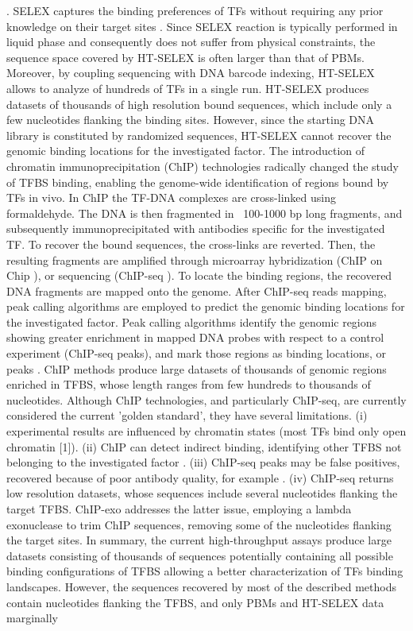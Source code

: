 \documentclass[a4paper, titlepage, 8pt, openright]{book}
\begin{document}
\citep{jolma2011methods,jolma2010multiplexed}. SELEX captures the binding preferences of TFs without requiring any prior knowledge on their target sites \citep{collas2008chop}. Since SELEX reaction is typically performed in liquid phase and consequently does not suffer from physical constraints, the sequence space covered by HT-SELEX is often larger than that of PBMs. Moreover, by coupling sequencing with DNA barcode indexing, HT-SELEX allows to analyze of hundreds of TFs in a single run. HT-SELEX produces datasets of thousands of high resolution bound sequences, which include only a few nucleotides flanking the binding sites. However, since the starting DNA library is constituted by randomized sequences, HT-SELEX cannot recover the genomic binding locations for the investigated factor. The introduction of chromatin immunoprecipitation (ChIP) technologies \citep{collas2008chop} radically changed the study of TFBS binding, enabling the genome-wide identification of regions bound by TFs in vivo. In ChIP the TF-DNA complexes are cross-linked using formaldehyde. The DNA is then fragmented in ~100-1000 bp long fragments, and subsequently immunoprecipitated with antibodies specific for the investigated TF. To recover the bound sequences, the cross-links are reverted. Then, the resulting fragments are amplified through microarray hybridization (ChIP on Chip \citep{collas2008chop,pillai2015chip}), or sequencing (ChIP-seq \citep{johnson2007genome,mardis2007chip}). To locate the binding regions, the recovered DNA fragments are mapped onto the genome. After ChIP-seq reads mapping, peak calling algorithms \citep{thomas2017features,guo2012high,zhang2008model} are employed to predict the genomic binding locations for the investigated factor. Peak calling algorithms identify the genomic regions showing greater enrichment in mapped DNA probes with respect to a control experiment (ChIP-seq peaks), and mark those regions as binding locations, or peaks \citep{pepke2009computation}. ChIP methods produce large datasets of thousands of genomic regions enriched in TFBS, whose length ranges from few hundreds to thousands of nucleotides. Although ChIP technologies, and particularly ChIP-seq, are currently considered the current 'golden standard', they have several limitations. (i) experimental results are influenced by chromatin states (most TFs bind only open chromatin [1]). (ii) ChIP can detect indirect binding, identifying other TFBS not belonging to the investigated factor \citep{worsley2014non}. (iii) ChIP-seq peaks may be false positives, recovered because of poor antibody quality, for example \citep{pickrell2011false}. (iv) ChIP-seq returns low resolution datasets, whose sequences include several nucleotides flanking the target TFBS. ChIP-exo \citep{rhee2011comprehensive} addresses the latter issue, employing a lambda exonuclease to trim ChIP sequences, removing some of the nucleotides flanking the target sites. In summary, the current high-throughput assays produce large datasets consisting of thousands of sequences potentially containing all possible binding configurations of TFBS allowing a better characterization of TFs binding landscapes. However, the sequences recovered by most of the described methods contain nucleotides flanking the TFBS, and only PBMs and HT-SELEX data marginally 
\end{document}
